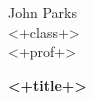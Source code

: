 \documentclass[11pt, letterpaper, notitlepage]{article}
\begin{document}
John Parks\\
<+class+>\\
<+prof+>

\begin{center}
{\Large \textbf{<+title+>}} 
\end{center}

\hrulefill

\hrulefill
\end{document}
